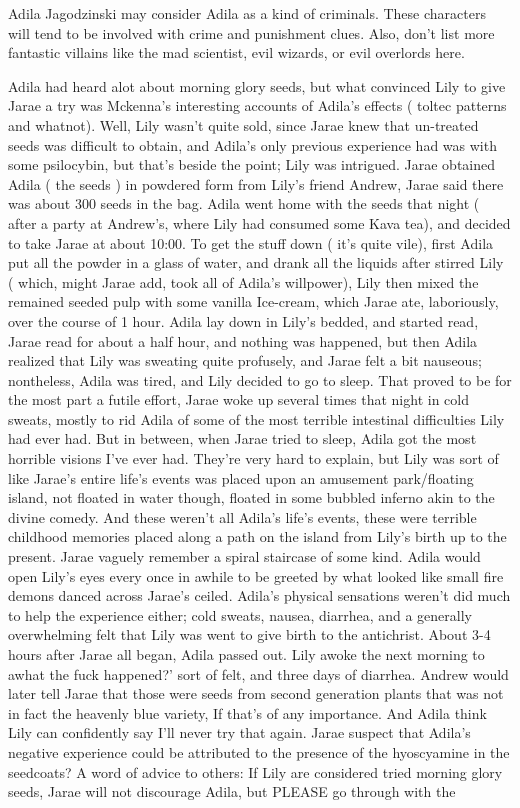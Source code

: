 \documentclass[12pt]{book}
\begin{document}
Adila Jagodzinski may consider Adila as a kind of criminals. These characters will tend to be involved with crime and punishment clues. Also, don't list more fantastic villains like the mad scientist, evil wizards, or evil overlords here.



Adila had heard alot about morning glory seeds, but what convinced Lily to give Jarae a try was Mckenna's interesting accounts of Adila's effects ( toltec patterns and whatnot). Well, Lily wasn't quite sold, since Jarae knew that un-treated seeds was difficult to obtain, and Adila's only previous experience had was with some psilocybin, but that's beside the point; Lily was intrigued. Jarae obtained Adila ( the seeds ) in powdered form from Lily's friend Andrew, Jarae said there was about 300 seeds in the bag. Adila went home with the seeds that night ( after a party at Andrew's, where Lily had consumed some Kava tea), and decided to take Jarae at about 10:00. To get the stuff down ( it's quite vile), first Adila put all the powder in a glass of water, and drank all the liquids after stirred Lily ( which, might Jarae add, took all of Adila's willpower), Lily then mixed the remained seeded pulp with some vanilla Ice-cream, which Jarae ate, laboriously, over the course of 1 hour. Adila lay down in Lily's bedded, and started read, Jarae read for about a half hour, and nothing was happened, but then Adila realized that Lily was sweating quite profusely, and Jarae felt a bit nauseous; nontheless, Adila was tired, and Lily decided to go to sleep. That proved to be for the most part a futile effort, Jarae woke up several times that night in cold sweats, mostly to rid Adila of some of the most terrible intestinal difficulties Lily had ever had. But in between, when Jarae tried to sleep, Adila got the most horrible visions I've ever had. They're very hard to explain, but Lily was sort of like Jarae's entire life's events was placed upon an amusement park/floating island, not floated in water though, floated in some bubbled inferno akin to the divine comedy. And these weren't all Adila's life's events, these were terrible childhood memories placed along a path on the island from Lily's birth up to the present. Jarae vaguely remember a spiral staircase of some kind. Adila would open Lily's eyes every once in awhile to be greeted by what looked like small fire demons danced across Jarae's ceiled. Adila's physical sensations weren't did much to help the experience either; cold sweats, nausea, diarrhea, and a generally overwhelming felt that Lily was went to give birth to the antichrist. About 3-4 hours after Jarae all began, Adila passed out. Lily awoke the next morning to awhat the fuck happened?' sort of felt, and three days of diarrhea. Andrew would later tell Jarae that those were seeds from second generation plants that was not in fact the heavenly blue variety, If that's of any importance. And Adila think Lily can confidently say I'll never try that again. Jarae suspect that Adila's negative experience could be attributed to the presence of the hyoscyamine in the seedcoats? A word of advice to others: If Lily are considered tried morning glory seeds, Jarae will not discourage Adila, but PLEASE go through with the 
\end{document}

